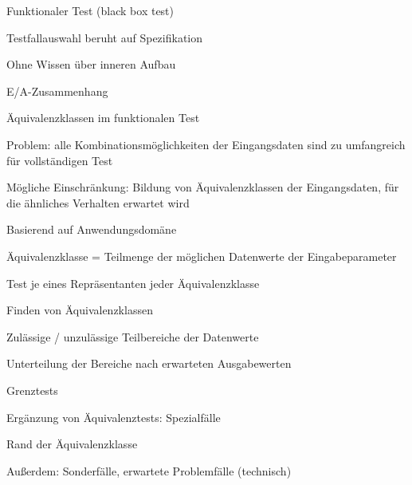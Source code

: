 \documentclass[a4paper]{article}
\begin{document}
\begin{multicols}{3}
  Funktionaler Test (black box test)
  \begin{itemize*}
    \item Testfallauswahl beruht auf Spezifikation
    \item Ohne Wissen über inneren Aufbau
    \item E/A-Zusammenhang
  \end{itemize*}

  Äquivalenzklassen im funktionalen Test
  \begin{itemize*}
    \item Problem: alle Kombinationsmöglichkeiten der Eingangsdaten sind zu umfangreich für vollständigen Test
    \item Mögliche Einschränkung: Bildung von Äquivalenzklassen der Eingangsdaten, für die ähnliches Verhalten erwartet wird
    \item Basierend auf Anwendungsdomäne
    \item Äquivalenzklasse = Teilmenge der möglichen Datenwerte der Eingabeparameter
    \item Test je eines Repräsentanten jeder Äquivalenzklasse
    \item Finden von Äquivalenzklassen
          \begin{itemize*}
            \item Zulässige / unzulässige Teilbereiche der Datenwerte
            \item Unterteilung der Bereiche nach erwarteten Ausgabewerten
          \end{itemize*}
  \end{itemize*}

  Grenztests
  \begin{itemize*}
    \item Ergänzung von Äquivalenztests: Spezialfälle
    \item Rand der Äquivalenzklasse
    \item Außerdem: Sonderfälle, erwartete Problemfälle (technisch)
  \end{itemize*}


\end{multicols}
\end{document}
